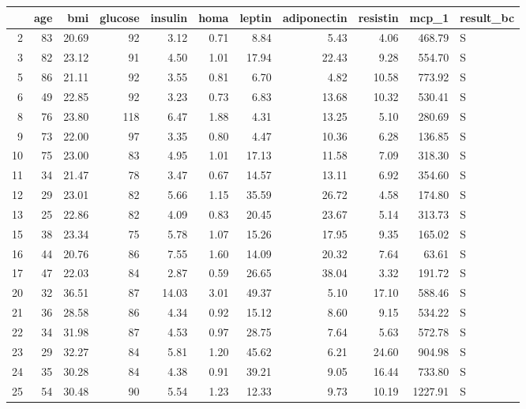 \begin{table}[ht]
\centering
\begin{tabular}{rrrrrrrrrrl}
  \hline
 & age & bmi & glucose & insulin & homa & leptin & adiponectin & resistin & mcp\_1 & result\_bc \\ 
  \hline
2 &  83 & 20.69 &  92 & 3.12 & 0.71 & 8.84 & 5.43 & 4.06 & 468.79 & S \\ 
  3 &  82 & 23.12 &  91 & 4.50 & 1.01 & 17.94 & 22.43 & 9.28 & 554.70 & S \\ 
  5 &  86 & 21.11 &  92 & 3.55 & 0.81 & 6.70 & 4.82 & 10.58 & 773.92 & S \\ 
  6 &  49 & 22.85 &  92 & 3.23 & 0.73 & 6.83 & 13.68 & 10.32 & 530.41 & S \\ 
  8 &  76 & 23.80 & 118 & 6.47 & 1.88 & 4.31 & 13.25 & 5.10 & 280.69 & S \\ 
  9 &  73 & 22.00 &  97 & 3.35 & 0.80 & 4.47 & 10.36 & 6.28 & 136.85 & S \\ 
  10 &  75 & 23.00 &  83 & 4.95 & 1.01 & 17.13 & 11.58 & 7.09 & 318.30 & S \\ 
  11 &  34 & 21.47 &  78 & 3.47 & 0.67 & 14.57 & 13.11 & 6.92 & 354.60 & S \\ 
  12 &  29 & 23.01 &  82 & 5.66 & 1.15 & 35.59 & 26.72 & 4.58 & 174.80 & S \\ 
  13 &  25 & 22.86 &  82 & 4.09 & 0.83 & 20.45 & 23.67 & 5.14 & 313.73 & S \\ 
  15 &  38 & 23.34 &  75 & 5.78 & 1.07 & 15.26 & 17.95 & 9.35 & 165.02 & S \\ 
  16 &  44 & 20.76 &  86 & 7.55 & 1.60 & 14.09 & 20.32 & 7.64 & 63.61 & S \\ 
  17 &  47 & 22.03 &  84 & 2.87 & 0.59 & 26.65 & 38.04 & 3.32 & 191.72 & S \\ 
  20 &  32 & 36.51 &  87 & 14.03 & 3.01 & 49.37 & 5.10 & 17.10 & 588.46 & S \\ 
  21 &  36 & 28.58 &  86 & 4.34 & 0.92 & 15.12 & 8.60 & 9.15 & 534.22 & S \\ 
  22 &  34 & 31.98 &  87 & 4.53 & 0.97 & 28.75 & 7.64 & 5.63 & 572.78 & S \\ 
  23 &  29 & 32.27 &  84 & 5.81 & 1.20 & 45.62 & 6.21 & 24.60 & 904.98 & S \\ 
  24 &  35 & 30.28 &  84 & 4.38 & 0.91 & 39.21 & 9.05 & 16.44 & 733.80 & S \\ 
  25 &  54 & 30.48 &  90 & 5.54 & 1.23 & 12.33 & 9.73 & 10.19 & 1227.91 & S \\ 

\end{tabular}
\end{table}
